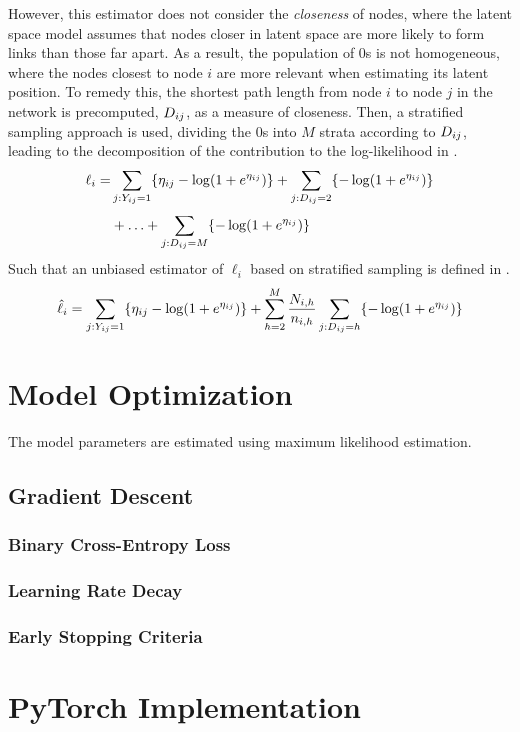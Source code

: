     However, this estimator does not consider the \emph{closeness} of nodes, where the latent space model assumes that nodes closer in latent space are more likely to form links than those far apart. As a result, the population of 0s is not homogeneous, where the nodes closest to node $i$ are more relevant when estimating its latent position. To remedy this, the shortest path length from node $i$ to node $j$ in the network is precomputed, $\sub(D)$, as a measure of closeness. Then, a stratified sampling approach is used, dividing the 0s into $M$ strata according to $\sub(D)$, leading to the decomposition of the contribution to the log-likelihood in .
    \begin{equation}
    \label{eq:case-stratified-likelihood}
        \setlength{\jot}{0.5\baselineskip}
        \begin{split}
            \ell_i = & \sum_{j:\sub(Y)=1} \{\sub(\eta)-\log(1+e^{\sub(\eta)}) \} + \sum_{j:\sub(D)=2} \{-\log(1+e^{\sub(\eta)}) \} \\
                     & + \ldots + \sum_{j:\sub(D)=M} \{-\log(1+e^{\sub(\eta)}) \}
        \end{split}
    \end{equation}
    Such that an unbiased estimator of $\ell_i$ based on stratified sampling is defined in .
    \begin{equation}
    \label{eq:case-stratified-estimate}
        \hat{\ell}_i = \sum_{j:\sub(Y)=1} \{\sub(\eta)-\log(1+e^{\sub(\eta)}) \} + \sum_{h=2}^M \frac{\sub(N)(i,h)}{\sub(n)(i,h)} \sum_{j:\sub(D)=h} \{-\log(1+e^{\sub(\eta)}) \}
    \end{equation}
    
    

\section{Model Optimization}

    The model parameters are estimated using maximum likelihood estimation.

    \subsection{Gradient Descent}

    \subsubsection{Binary Cross-Entropy Loss}
    
    \subsubsection{Learning Rate Decay}
    
    \subsubsection{Early Stopping Criteria}
    
\section{PyTorch Implementation}